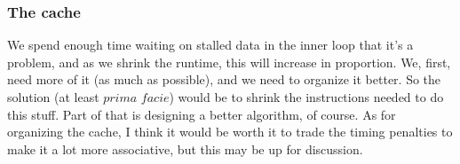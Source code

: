 \documentclass[a4paper]{article}
\begin{document}
\subsubsection{The cache}

We spend enough time waiting on stalled data in the inner loop that it's a problem, and as we shrink the runtime, this will increase in proportion. We, first, need more of it (as much as possible), and we need to organize it better. So the solution (at least $\textit{prima facie}$) would be to shrink the instructions needed to do this stuff. Part of that is designing a better algorithm, of course. As for organizing the cache, I think it would be worth it to trade the timing penalties to make it a lot more associative, but this may be up for discussion.
\end{document}
